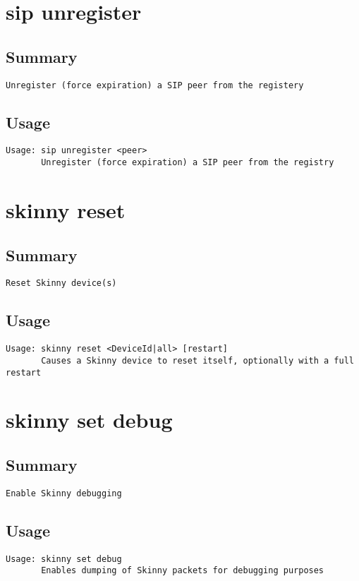 \section{sip unregister}
\subsection{Summary}
\begin{verbatim}
Unregister (force expiration) a SIP peer from the registery

\end{verbatim}
\subsection{Usage}
\begin{verbatim}
Usage: sip unregister <peer>
       Unregister (force expiration) a SIP peer from the registry

\end{verbatim}


\section{skinny reset}
\subsection{Summary}
\begin{verbatim}
Reset Skinny device(s)
\end{verbatim}
\subsection{Usage}
\begin{verbatim}
Usage: skinny reset <DeviceId|all> [restart]
       Causes a Skinny device to reset itself, optionally with a full restart

\end{verbatim}


\section{skinny set debug}
\subsection{Summary}
\begin{verbatim}
Enable Skinny debugging
\end{verbatim}
\subsection{Usage}
\begin{verbatim}
Usage: skinny set debug
       Enables dumping of Skinny packets for debugging purposes

\end{verbatim}


